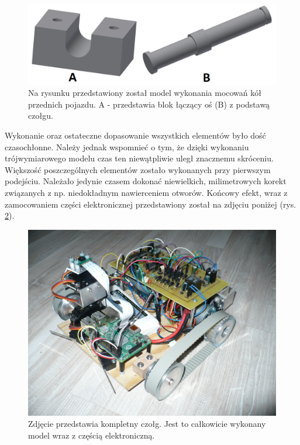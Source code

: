   \begin{figure}[H]
    \begin{center}
      \includegraphics[scale=0.40]{imgs/moc_kol_prz.png}
 	\caption[Model mocowania kół przednich.]{\small{Na rysunku przedstawiony został model wykonania mocowań kół przednich pojazdu. A - przedstawia blok łączący oś (B) z podstawą czołgu.}}
	\label{zamocowanie_przod}
    \end{center}
  \end{figure}
  \newpage
{}
Wykonanie oraz ostateczne dopasowanie wszystkich elementów było dość czasochłonne. Należy jednak wspomnieć o tym, że dzięki wykonaniu trójwymiarowego modelu czas ten niewątpliwie uległ znacznemu skróceniu. Większość poszczególnych elementów zostało wykonanych przy pierwszym podejściu. Należało jedynie czasem dokonać niewielkich, milimetrowych korekt związanych z np. niedokładnym nawierceniem otworów. Końcowy efekt, wraz z zamocowaniem części elektronicznej przedstawiony został na zdjęciu poniżej (rys. \ref{czolg_calosc}).
  \begin{figure}[H]
    \begin{center}
      \includegraphics[scale=0.13]{imgs/czolg.jpg}
 	\caption[Zbudowany model.]{\small{Zdjęcie przedstawia kompletny czołg. Jest to całkowicie wykonany model wraz z częścią elektroniczną.}}
	\label{czolg_calosc}
    \end{center}
  \end{figure}
